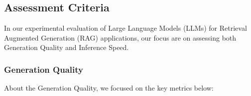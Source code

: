 \documentclass[runningheads]{llncs}
\begin{document}
\subsection{Assessment Criteria}


In our experimental evaluation of Large Language Models (LLMs) for Retrieval Augmented Generation (RAG) applications, our focus are on assessing both Generation Quality and Inference Speed. 

\subsubsection{Generation Quality}
About the Generation Quality, we focused on the key metrics below:
\end{document}
